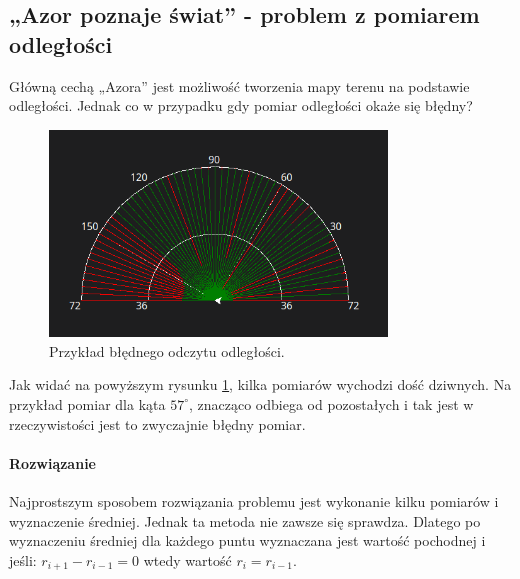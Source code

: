     \subsection{„Azor poznaje świat” - problem z pomiarem odległości}
        \tab Główną cechą „Azora” jest możliwość  tworzenia mapy terenu na podstawie odległości.
        Jednak co w przypadku gdy pomiar odległości okaże się błędny?
        \begin{figure}[!h]
            \centering
            \includegraphics[width = 0.8\textwidth]{Img/radar_error.png}
            \caption{Przykład błędnego odczytu odległości.}
            \label{error:radar_error}
        \end{figure}
        Jak widać na powyższym rysunku \ref{error:radar_error}, kilka pomiarów wychodzi dość dziwnych.
        Na przykład pomiar dla kąta $57^\circ$, znacząco odbiega od pozostałych i tak jest w rzeczywistości jest to zwyczajnie błędny pomiar.

        \paragraph{Rozwiązanie\\}
        Najprostszym sposobem rozwiązania problemu jest wykonanie kilku pomiarów i wyznaczenie średniej.
        Jednak ta metoda nie zawsze się sprawdza.
        Dlatego po wyznaczeniu średniej dla każdego puntu wyznaczana jest wartość pochodnej i jeśli: $r_{i+1} - r_{i-1} = 0$ wtedy wartość $r_i = r_{i-1}$.